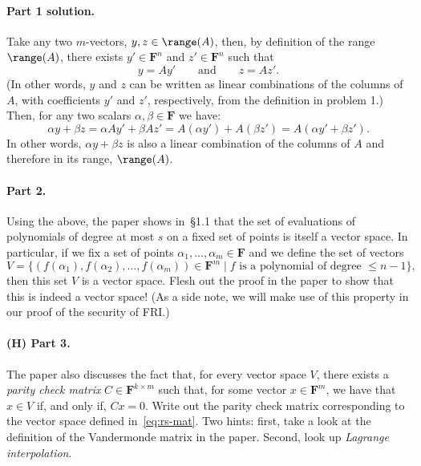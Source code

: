 \documentclass[12pt,hidelinks]{article}
\newcommand{\field}{\mathbf{F}}
\begin{document}
\begin{solution}
\paragraph{Part 1 solution.} Take any two $m$-vectors, $y, z \in \range(A)$,
then, by definition of the range $\range(A)$, there exists $y' \in \field^n$
and $z' \in \field^n$ such that
\[
    y = Ay' \qquad \text{and} \qquad z = Az'.
\]
(In other words, $y$ and $z$ can be written as linear combinations of the
columns of $A$, with coefficients $y'$ and $z'$, respectively, from the
definition in problem 1.) Then, for any two scalars $\alpha, \beta \in \field$
we have:
\[
    \alpha y + \beta z = \alpha Ay' + \beta Az' = A(\alpha y') + A(\beta z') = A(\alpha y' + \beta z').
\]
In other words, $\alpha y + \beta z$ is also a linear combination of the
columns of $A$ and therefore in its range, $\range(A)$.
\end{solution}


\paragraph{Part 2.} Using the above, the paper shows in~\S1.1 that the set of
evaluations of polynomials of degree at most $s$ on a fixed set of points is
itself a vector space. In particular, if we fix a set of points $\alpha_1,
\dots, \alpha_m \in \field$ and we define the set of vectors
\begin{equation}\label{eq:rs-mat}
    V = \{(f(\alpha_1), f(\alpha_2), \dots, f(\alpha_m)) \in \field^m \mid \text{$f$ is a polynomial of degree $\le n-1$}\},
\end{equation}
then this set $V$ is a vector space. Flesh out the proof in the paper to show
that this is indeed a vector space! (As a side note, we will make use of this
property in our proof of the security of FRI.)

\paragraph{(H) Part 3.} The paper also discusses the fact that, for every
vector space $V$, there exists a \emph{parity check matrix} $C \in
\field^{k\times m}$ such that, for some vector $x \in \field^m$, we have that
$x \in V$ if, and only if, $Cx = 0$. Write out the parity check matrix
corresponding to the vector space defined in~\eqref{eq:rs-mat}.
Two hints: first, take a look at the definition of the Vandermonde matrix
in the paper. Second, look up \emph{Lagrange interpolation}.
\end{document}
